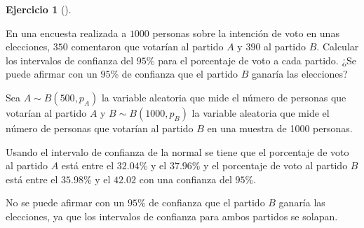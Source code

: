 \documentclass[
  spanish,
  a4paper,
]{scrreport}
\theoremstyle{definition}
\newtheorem{exercise}{Ejercicio}[chapter]
\theoremstyle{remark}
\begin{document}
\begin{exercise}[]\protect\hypertarget{exr-intervalo-confianza-comparación-proporciones-voto}{}\label{exr-intervalo-confianza-comparación-proporciones-voto}

En una encuesta realizada a \(1000\) personas sobre la intención de voto
en unas elecciones, \(350\) comentaron que votarían al partido \(A\) y
\(390\) al partido \(B\). Calcular los intervalos de confianza del
\(95\)\% para el porcentaje de voto a cada partido. ¿Se puede afirmar
con un \(95\)\% de confianza que el partido \(B\) ganaría las
elecciones?

\end{exercise}

\begin{tcolorbox}[enhanced jigsaw, arc=.35mm, bottomrule=.15mm, bottomtitle=1mm, breakable, colback=white, colbacktitle=quarto-callout-tip-color!10!white, colframe=quarto-callout-tip-color-frame, coltitle=black, left=2mm, leftrule=.75mm, opacityback=0, opacitybacktitle=0.6, rightrule=.15mm, title=\textcolor{quarto-callout-tip-color}{\faLightbulb}\hspace{0.5em}{Solución}, titlerule=0mm, toprule=.15mm, toptitle=1mm]

Sea \(A\sim B(500, p_A)\) la variable aleatoria que mide el número de
personas que votarían al partido \(A\) y \(B\sim B(1000, p_B)\) la
variable aleatoria que mide el número de personas que votarían al
partido \(B\) en una muestra de 1000 personas.

Usando el intervalo de confianza de la normal se tiene que el porcentaje
de voto al partido \(A\) está entre el \(32.04\)\% y el \(37.96\)\% y el
porcentaje de voto al partido \(B\) está entre el \(35.98\)\% y el
\(42.02\) con una confianza del \(95\)\%.

No se puede afirmar con un \(95\)\% de confianza que el partido \(B\)
ganaría las elecciones, ya que los intervalos de confianza para ambos
partidos se solapan.

\end{tcolorbox}
\end{document}

